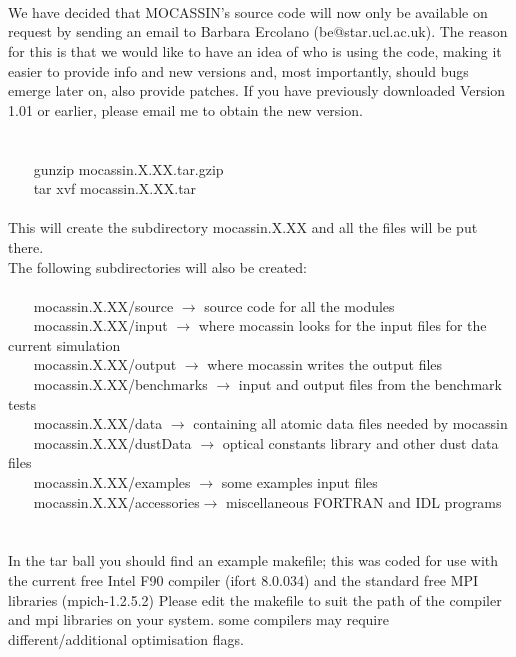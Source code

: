 \documentclass[11pt]{article}
\begin{document}
\pagebreak



\\
\\
\\
   We have decided that MOCASSIN's source code will now only be available on
   request by sending an email to Barbara Ercolano (be@star.ucl.ac.uk). The 
   reason for this is that we would like to have an idea of who is using the
   code, making it easier to provide info and new versions and, most importantly,
   should bugs emerge later on, also provide patches. If you have previously 
   downloaded Version 1.01 or earlier, please email me to obtain the new version. \\
\\   
\\
\noindent ~~~    gunzip mocassin.X.XX.tar.gzip\\
\noindent ~~~    tar xvf mocassin.X.XX.tar\\
\\
   This will create the subdirectory mocassin.X.XX and all the files will be put 
   there.\\
   The following subdirectories will also be created:\\
\\
\noindent ~~~    mocassin.X.XX/source     $\rightarrow$ source code for all the modules\\
\noindent ~~~    mocassin.X.XX/input      $\rightarrow$ where mocassin looks for the input files for the 
                               current simulation \\
\noindent ~~~    mocassin.X.XX/output     $\rightarrow$ where mocassin writes the output files \\
\noindent ~~~    mocassin.X.XX/benchmarks $\rightarrow$ input and output files from the benchmark tests \\
\noindent ~~~    mocassin.X.XX/data       $\rightarrow$ containing all atomic data files needed by mocassin \\
\noindent ~~~    mocassin.X.XX/dustData   $\rightarrow$ optical constants library and other dust data files \\
\noindent ~~~    mocassin.X.XX/examples   $\rightarrow$ some examples input files\\
\noindent ~~~    mocassin.X.XX/accessories$\rightarrow$ miscellaneous FORTRAN and IDL programs\\
\\
\\
   In the tar ball you should find an example makefile;
   this was coded for use with the current free Intel F90 compiler 
   (ifort 8.0.034) and the standard free MPI libraries (mpich-1.2.5.2)
   Please edit the makefile to suit the path of the  compiler and mpi libraries on
   your system. some compilers may require different/additional optimisation flags.   \\
\end{document}
